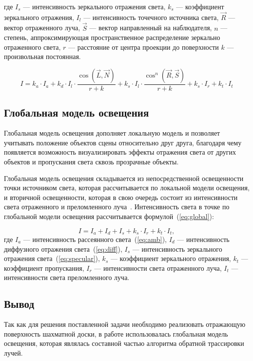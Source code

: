 \begin{enumerate}[label=\arabic*)]
	\noindent где 
	$I_{s}$ --- интенсивность зеркального отражения света,
	$k_{s}$ --- коэффициент зеркального отражения,
	$I_{l}$ --- интенсивность точечного источника света,
	$\overrightarrow{R}$ --- вектор отраженного луча, 
	$\overrightarrow{S}$ --- вектор направленный на наблюдателя,
	$n$ ---  степень, аппроксимирующая пространственное распределение зеркально отраженного света,
	$r$ --- расстояние от центра проекции до поверхности
	$k$ --- произвольная постоянная.
	
	
\end{enumerate}

\begin{equation}\label{eq:all}
	I = k_{a} \cdot I_{a} + k_{d} \cdot I_{l} \cdot \frac{\cos(\overrightarrow{L}, \overrightarrow{N})}{r + k} + k_{s} \cdot I_{l} \cdot \frac{\cos^n(\overrightarrow{R}, \overrightarrow{S})}{r + k} + k_{s} \cdot I_{r} + k_{t} \cdot I_{t}
\end{equation}

\subsection{Глобальная модель освещения}
Глобальная модель освещения дополняет локальную модель и позволяет учитывать положение объектов сцены относительно друг друга, благодаря чему появляется возможность визуализировать эффекты отражения света от других объектов и пропускания света сквозь прозрачные объекты.

Глобальная модель освещения складывается из непосредственной освещенности точки источником света, которая рассчитывается по локальной модели освещения, и вторичной освещенности, которая в свою очередь состоит из интенсивности света отраженного и преломленного луча~\cite{shikin2001}. Интенсивность света в точке по глобальной модели освещения рассчитывается  формулой~(\ref{eq:global}):

\begin{equation}\label{eq:global}
	I = I_{a} + I_{d} + I_{s} + k_{s} \cdot I_{r} + k_{t} \cdot I_{t},
\end{equation}
\noindent где 
	$I_{a}$ --- интенсивность рассеянного света~(\ref{eq:amb}), 
	$I_{d}$ --- интенсивность диффузного отражения света~(\ref{eq:diff}), 
	$I_{s}$ --- интенсивность зеркального отражения света~(\ref{eq:specular}),
	$k_{s}$ --- коэффициент зеркального отражения,
	$k_{t}$ --- коэффициент пропускания,
	$I_{r}$ --- интенсивности света отраженного луча,
	$I_{t}$ --- интенсивности света преломленного луча.
\subsection*{Вывод}
Так как для решения поставленной задачи необходимо реализовать отражающую поверхность шахматной доски, в работе использовалась глобальная модель освещения, которая являлась составной частью алгоритма обратной трассировки лучей.



